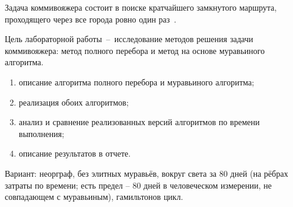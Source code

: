 
Задача коммивояжера состоит в поиске кратчайшего замкнутого маршрута, проходящего через все города ровно один раз~\cite{shtovba}.

Цель лабораторной работы~--~исследование методов решения задачи коммивояжера: метод полного перебора и метод на основе муравьиного алгоритма.

\begin{enumerate}
\item описание алгоритма полного перебора и муравьиного алгоритма;
\item реализация обоих алгоритмов;
\item анализ и сравнение реализованных версий алгоритмов по времени выполнения;
\item описание результатов в отчете.
\end{enumerate}

Вариант:  неорграф, без элитных муравьёв, вокруг света за 80 дней (на рёбрах затраты по времени; есть предел -- 80 дней в человеческом измерении, не совпадающем с муравьиным), гамильтонов цикл.
